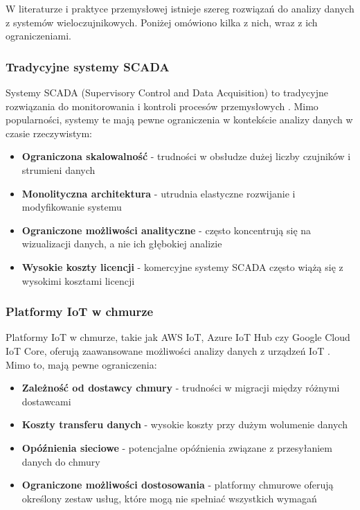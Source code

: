 W literaturze i praktyce przemysłowej istnieje szereg rozwiązań do analizy danych z systemów wieloczujnikowych. Poniżej omówiono kilka z nich, wraz z ich ograniczeniami.

\subsubsection{Tradycyjne systemy SCADA}
\label{subsubsec:scada}

Systemy SCADA (Supervisory Control and Data Acquisition) to tradycyjne rozwiązania do monitorowania i kontroli procesów przemysłowych \citep{scada}.
Mimo popularności, systemy te mają pewne ograniczenia w kontekście analizy danych w czasie rzeczywistym:

\begin{itemize}
    \item \textbf{Ograniczona skalowalność} - trudności w obsłudze dużej liczby czujników i strumieni danych
    \item \textbf{Monolityczna architektura} - utrudnia elastyczne rozwijanie i modyfikowanie systemu
    \item \textbf{Ograniczone możliwości analityczne} - często koncentrują się na wizualizacji danych, a nie ich głębokiej analizie
    \item \textbf{Wysokie koszty licencji} - komercyjne systemy SCADA często wiążą się z wysokimi kosztami licencji
\end{itemize}

\subsubsection{Platformy IoT w chmurze}
\label{subsubsec:cloud_iot}

Platformy IoT w chmurze, takie jak AWS IoT, Azure IoT Hub czy Google Cloud IoT Core, oferują zaawansowane możliwości analizy danych z
urządzeń IoT \citep{cloud_iot}. Mimo to, mają pewne ograniczenia:

\begin{itemize}
    \item \textbf{Zależność od dostawcy chmury} - trudności w migracji między różnymi dostawcami
    \item \textbf{Koszty transferu danych} - wysokie koszty przy dużym wolumenie danych
    \item \textbf{Opóźnienia sieciowe} - potencjalne opóźnienia związane z przesyłaniem danych do chmury
    \item \textbf{Ograniczone możliwości dostosowania} - platformy chmurowe oferują określony zestaw usług, które mogą nie spełniać wszystkich wymagań
\end{itemize}

